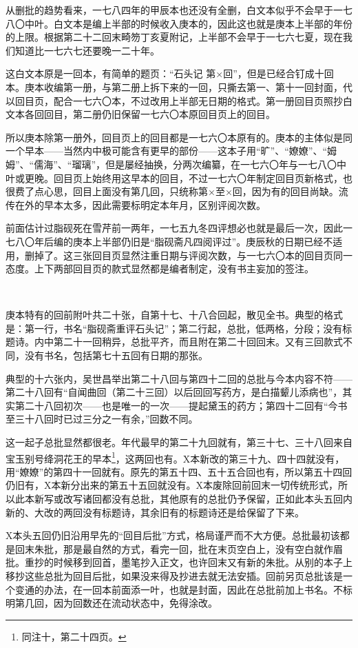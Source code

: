 \par 从删批的趋势看来，一七八四年的甲辰本也还没有全删，白文本似乎不会早于一七八〇中叶。白文本是编上半部的时候收入庚本的，因此这也就是庚本上半部的年份的上限。根据第二十二回末畸笏丁亥夏附记，上半部不会早于一七六七夏，现在我们知道比一七六七还要晚一二十年。
\par 这白文本原是一回本，有简单的题页：“石头记 第×回”，但是已经合钉成十回本。庚本收编第一册，与第二册上拆下来的一回，只撕去第一、第十一回封面，代以回目页，配合一七六〇本，不过改用上半部无日期的格式。第一册回目页照抄白文本各回回目，第二册仍旧保留一七六〇本原回目页上的回目。
\par 所以庚本除第一册外，回目页上的回目都是一七六〇本原有的。庚本的主体似是同一个早本——当然内中极可能含有更早的部份——这本子用“旷”、“嫽嫽”、“姆姆”、“儒海”、“瑠璃”，但是屡经抽换，分两次编纂，在一七六〇年与一七八〇中叶或更晚。回目页上始终用这早本的回目，不过一七六〇年制定回目页新格式，也很费了点心思，回目上面没有第几回，只统称第×至×回，因为有的回目尚缺。流传在外的早本太多，因此需要标明定本年月，区别评阅次数。
\par 前面估计过脂砚死在雪芹前一两年，一七五九冬四评想必也就是最后一次，因此一七八〇年后编的庚本上半部仍旧是“脂砚斋凡四阅评过”。庚辰秋的日期已经不适用，删掉了。这三张回目页显然注重日期与评阅次数，与一七六〇本的回目页同一态度。上下两部回目页的款式显然都是编者制定，没有书主妄加的签注。
\par  
\par 庚本特有的回前附叶共二十张，自第十七、十八合回起，散见全书。典型的格式是：第一行，书名“脂砚斋重评石头记”；第二行起，总批，低两格，分段；没有标题诗。内中第二十一回稍异，总批平齐，而且附在第二十回回末。又有三回款式不同，没有书名，包括第七十五回有日期的那张。
\par 典型的十六张内，吴世昌举出第二十八回与第四十二回的总批与今本内容不符——第二十八回有“自闻曲回（第二十三回）以后回回写药方，是白描颦儿添病也”，其实第二十八回初次——也是唯一的一次——提起黛玉的药方；第四十二回有“今书至三十八回时已过三分之一有余，”回数不同。
\par 这一起子总批显然都很老。年代最早的第二十九回就有，第三十七、三十八回来自宝玉别号绛洞花王的早本\footnote{同注十，第二十四页。}，这两回也有。X本新改的第三十九、四十四就没有，用“嫽嫽”的第四十一回就有。原先的第五十四、五十五合回也有，所以第五十四回仍旧有，X本新分出来的第五十五回就没有。X本废除回前回末一切传统形式，所以此本新写或改写诸回都没有总批，其他原有的总批仍予保留，正如此本头五回内新的、大改的两回没有标题诗，其余旧有的标题诗还是给保留了下来。
\par X本头五回仍旧沿用早先的“回目后批”方式，格局谨严而不大方便。总批最初该都是回末朱批，那是最自然的方式，看完一回，批在末页空白上，没有空白就作眉批。重抄的时候移到回首，墨笔抄入正文，也许回末又有新的朱批。从别的本子上移抄这些总批为回目后批，如果没来得及抄进去就无法安插。回前另页总批该是一个变通的办法，在一回本前面添一叶，也就是封面，因此在总批前加上书名。不标明第几回，因为回数还在流动状态中，免得涂改。
